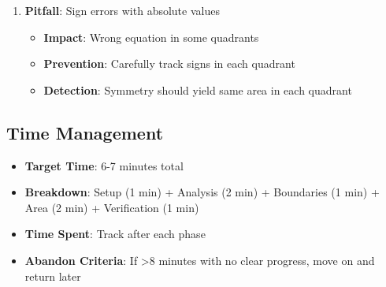 \documentclass[]{article}
\begin{document}
\begin{solutionbox}
\begin{enumerate}[leftmargin=*]
    \item \textbf{Pitfall}: Sign errors with absolute values
    \begin{itemize}
        \item \textbf{Impact}: Wrong equation in some quadrants
        \item \textbf{Prevention}: Carefully track signs in each quadrant
        \item \textbf{Detection}: Symmetry should yield same area in each quadrant
    \end{itemize}
\end{enumerate}

\subsection*{Time Management}
\begin{itemize}[leftmargin=*]
    \item \textbf{Target Time}: 6-7 minutes total
    \item \textbf{Breakdown}: Setup (1 min) + Analysis (2 min) + Boundaries (1 min) + Area (2 min) + Verification (1 min)
    \item \textbf{Time Spent}: Track after each phase
    \item \textbf{Abandon Criteria}: If >8 minutes with no clear progress, move on and return later
\end{itemize}
\end{solutionbox}
\end{document}
